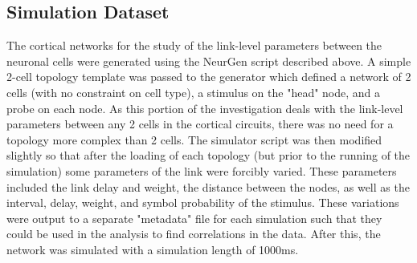 \documentclass[letterpaper, 10 pt, conference]{ieeeconf}  %
\begin{document}
\subsection*{Simulation Dataset}

The cortical networks for the study of the link-level parameters between the neuronal cells were generated using the NeurGen script described above. A simple 2-cell topology template was passed to the generator which defined a network of 2 cells (with no constraint on cell type), a stimulus on the "head" node, and a probe on each node. As this portion of the investigation deals with the link-level parameters between any 2 cells in the cortical circuits, there was no need for a topology more complex than 2 cells. The simulator script was then modified slightly so that after the loading of each topology (but prior to the running of the simulation) some parameters of the link were forcibly varied. These parameters included the link delay and weight, the distance between the nodes, as well as the interval, delay, weight, and symbol probability of the stimulus. These variations were output to a separate "metadata" file for each simulation such that they could be used in the analysis to find correlations in the data. After this, the network was simulated with a simulation length of 1000ms.
\end{document}
